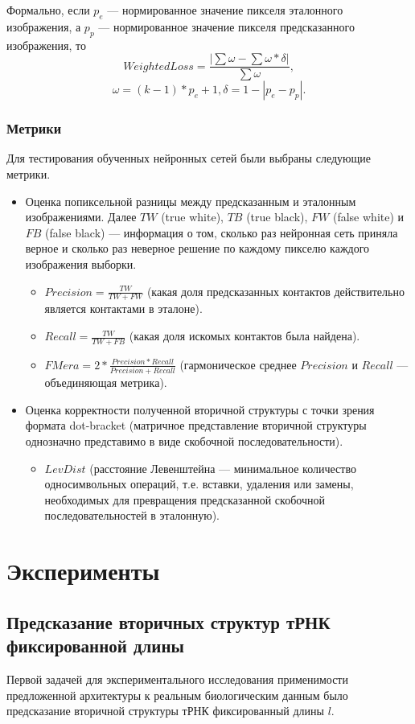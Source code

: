 \documentclass[14pt]{matmex-diploma-custom}
\begin{document}
Формально, если $p_{e}$ --- нормированное значение пикселя эталонного изображения, а $p_{p}$ --- нормированное значение пикселя предсказанного изображения, то 
\[WeightedLoss = \frac{|\sum \omega - \sum \omega \ast \delta |}{\sum \omega},\] 
\[\omega = (k - 1) \ast p_{e} + 1, \delta = 1 - |p_{e} - p_{p}|.\]

\subsubsection{Метрики}
Для тестирования обученных нейронных сетей были выбраны следующие метрики.
\begin{itemize}
    \item Оценка попиксельной разницы между предсказанным и эталонным изображениями. Далее $TW$ (true white), $TB$ (true black), $FW$ (false white) и $FB$ (false black) --- информация о том, сколько раз нейронная сеть приняла верное и сколько раз неверное решение по каждому пикселю каждого изображения выборки.
    \begin{itemize}
        \item $Precision = \frac{TW}{TW + FW}$ (какая доля предсказанных контактов действительно является контактами в эталоне).
        \item $Recall = \frac{TW}{TW + FB}$ (какая доля искомых контактов была найдена).
        \item $FMera = 2 * \frac{Precision * Recall}{Precision + Recall}$ (гармоническое среднее $Precision$ и $Recall$ --- объединяющая метрика).
    \end{itemize}
    \item Оценка корректности полученной вторичной структуры с точки зрения формата dot-bracket (матричное представление вторичной структуры однозначно представимо в виде скобочной последовательности).
     \begin{itemize}
        \item $LevDist$ (расстояние Левенштейна --- минимальное количество односимвольных операций, т.е. вставки, удаления или замены, необходимых для превращения предсказанной скобочной последовательностей в эталонную).
    \end{itemize}   
\end{itemize}

\section{Эксперименты}
\subsection{Предсказание вторичных структур тРНК фиксированной длины}
Первой задачей для экспериментального исследования применимости предложенной архитектуры к реальным биологическим данным было предсказание вторичной структуры тРНК фиксированный длины $l$. 
\end{document}
